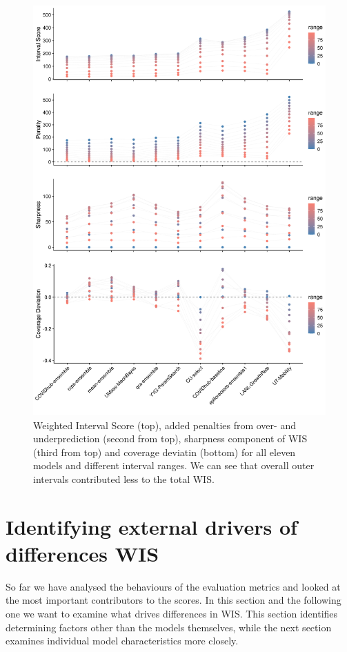 \documentclass[
]{book}
\begin{document}
\begin{figure}
\includegraphics[width=1\linewidth]{../visualisation/chapter-5-results/scenario-baseline/all-range-plots} \caption{Weighted Interval Score (top), added penalties from over- and underprediction (second from top), sharpness component of WIS (third from top) and coverage deviatin (bottom) for all eleven models and different interval ranges. We can see that overall outer intervals contributed less to the total WIS.}\label{fig:scores-ranges}
\end{figure}

\hypertarget{external-drivers}{%
\section{Identifying external drivers of differences WIS}\label{external-drivers}}

So far we have analysed the behaviours of the evaluation metrics and looked at the most important contributors to the scores. In this section and the following one we want to examine what drives differences in WIS. This section identifies determining factors other than the models themselves, while the next section examines individual model characteristics more closely.
\end{document}
